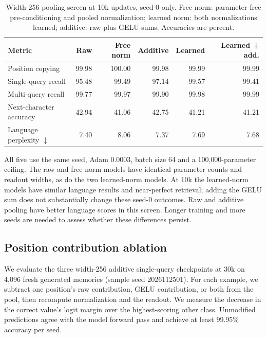 \documentclass[11pt]{article}
\begin{document}
\begin{table}[htbp]
\centering\small
\caption{Width-256 pooling screen at 10k updates, seed 0 only. Free norm:
parameter-free pre-conditioning and pooled normalization; learned norm: both
normalizations learned; additive: raw plus GELU sums. Accuracies are percent.}
\label{tab:norm-additive-screen}
\begin{tabular}{lrrrrr}
\toprule
Metric & Raw & Free norm & Additive & Learned & Learned + add.\\
\midrule
Position copying & 99.98 & 100.00 & 99.98 & 99.99 & 99.99\\
Single-query recall & 95.48 & 99.49 & 97.14 & 99.57 & 99.41\\
Multi-query recall & 99.77 & 99.97 & 99.90 & 99.98 & 99.99\\
Next-character accuracy & 42.94 & 41.06 & 42.75 & 41.21 & 41.21\\
Language perplexity \(\downarrow\) & 7.40 & 8.06 & 7.37 & 7.69 & 7.68\\
\bottomrule
\end{tabular}
\end{table}

All five use the same seed, Adam 0.0003, batch size 64 and a 100,000-parameter
ceiling. The raw and free-norm models have identical parameter counts and
readout widths, as do the two learned-norm models. At 10k the learned-norm
models have similar language results and near-perfect retrieval; adding the
GELU sum does not substantially change these seed-0 outcomes. Raw and
additive pooling have better language scores in this screen. Longer training
and more seeds are needed to assess whether these differences persist.

\subsection{Position contribution ablation}
We evaluate the three width-256 additive single-query checkpoints at 30k on 4,096 fresh generated memories (sample seed 2026112501). For each example, we subtract one position's raw contribution, GELU contribution, or both from the pool, then recompute normalization and the readout. We measure the decrease in the correct value's logit margin over the highest-scoring other class. Unmodified predictions agree with the model forward pass and achieve at least 99.95\% accuracy per seed.
\end{document}
